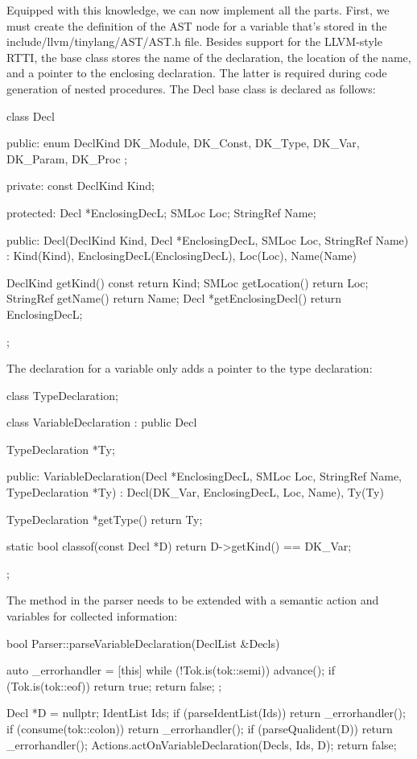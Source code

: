 
Equipped with this knowledge, we can now implement all the parts. First, we must create the definition of the AST node for a variable that’s stored in the include/llvm/tinylang/AST/AST.h file. Besides support for the LLVM-style RTTI, the base class stores the name of the declaration, the location of the name, and a pointer to the enclosing declaration. The latter is required during code generation of nested procedures. The Decl base class is declared as follows:

\begin{cpp}
class Decl {
public:
    enum DeclKind { DK_Module, DK_Const, DK_Type,
                    DK_Var, DK_Param, DK_Proc };

private:
    const DeclKind Kind;

protected:
    Decl *EnclosingDecL;
    SMLoc Loc;
    StringRef Name;

public:
    Decl(DeclKind Kind, Decl *EnclosingDecL, SMLoc Loc,
        StringRef Name)
        : Kind(Kind), EnclosingDecL(EnclosingDecL), Loc(Loc),
        Name(Name) {}

    DeclKind getKind() const { return Kind; }
    SMLoc getLocation() { return Loc; }
    StringRef getName() { return Name; }
    Decl *getEnclosingDecl() { return EnclosingDecL; }
};
\end{cpp}

The declaration for a variable only adds a pointer to the type declaration:

\begin{cpp}
class TypeDeclaration;

class VariableDeclaration : public Decl {
    TypeDeclaration *Ty;

public:
    VariableDeclaration(Decl *EnclosingDecL, SMLoc Loc,
                        StringRef Name, TypeDeclaration *Ty)
        : Decl(DK_Var, EnclosingDecL, Loc, Name), Ty(Ty) {}

    TypeDeclaration *getType() { return Ty; }

    static bool classof(const Decl *D) {
        return D->getKind() == DK_Var;
    }
};
\end{cpp}

The method in the parser needs to be extended with a semantic action and variables for collected information:

\begin{cpp}
bool Parser::parseVariableDeclaration(DeclList &Decls) {
    auto _errorhandler = [this] {
        while (!Tok.is(tok::semi)) {
            advance();
            if (Tok.is(tok::eof)) return true;
        }
        return false;
    };

    Decl *D = nullptr; IdentList Ids;
    if (parseIdentList(Ids)) return _errorhandler();
    if (consume(tok::colon)) return _errorhandler();
    if (parseQualident(D)) return _errorhandler();
    Actions.actOnVariableDeclaration(Decls, Ids, D);
    return false;
}
\end{cpp}

